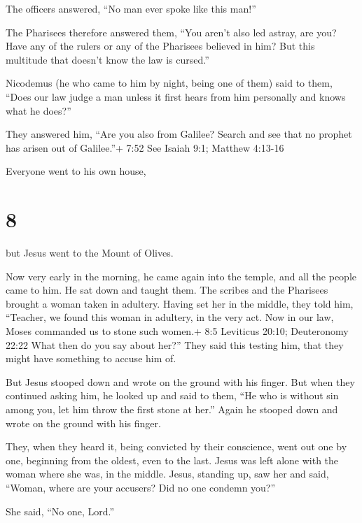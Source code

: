  The officers answered, ``No man ever spoke like this
man!''

 The Pharisees therefore answered them, ``You aren't also
led astray, are you?  Have any of the rulers or any of the
Pharisees believed in him?  But this multitude that doesn't
know the law is cursed.''

 Nicodemus (he who came to him by night, being one of them)
said to them,  ``Does our law judge a man unless it first
hears from him personally and knows what he does?''

 They answered him, ``Are you also from Galilee? Search and
see that no prophet has arisen out of Galilee.''+ 7:52 See Isaiah 9:1;
Matthew 4:13-16

 Everyone went to his own house,

\hypertarget{section-7}{%
\section{8}\label{section-7}}

 but Jesus went to the Mount of Olives.

 Now very early in the morning, he came again into the
temple, and all the people came to him. He sat down and taught them.
 The scribes and the Pharisees brought a woman taken in
adultery. Having set her in the middle,  they told him,
``Teacher, we found this woman in adultery, in the very act.
 Now in our law, Moses commanded us to stone such women.+
8:5 Leviticus 20:10; Deuteronomy 22:22 What then do you say about her?''
 They said this testing him, that they might have something
to accuse him of.

But Jesus stooped down and wrote on the ground with his finger.
 But when they continued asking him, he looked up and said
to them, ``He who is without sin among you, let him throw the first
stone at her.''  Again he stooped down and wrote on the
ground with his finger.

 They, when they heard it, being convicted by their
conscience, went out one by one, beginning from the oldest, even to the
last. Jesus was left alone with the woman where she was, in the middle.
 Jesus, standing up, saw her and said, ``Woman, where are
your accusers? Did no one condemn you?''

 She said, ``No one, Lord.''

